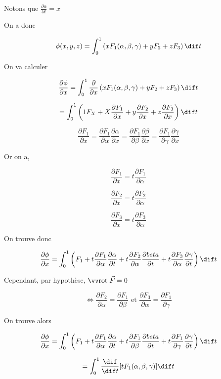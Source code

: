 Notons que $\frac{\partial \alpha}{\partial t} = x$

On a donc

\[\phi (x,y,z) = \int_0^1 \left( x F_1 (\alpha, \beta, \gamma ) + y F_2 + z F_3 \right) \dif t \]

On va calculer

\[\frac{\partial \phi}{\partial x} = \int_0^1 \frac{\partial}{\partial x} \left( x F_1 (\alpha, \beta, \gamma ) + y F_2 + z F_3 \right) \dif t\]

\[= \int_0^1 \left( 1F_X +X \frac{\partial F_1}{\partial x} + y \frac{\partial F_2}{\partial x} + z \frac{\partial F_3}{\partial x} \right) \dif t\]


\[
\frac{\partial F_1}{\partial x} = \frac{\partial F_1}{\partial \alpha} \frac{\partial \alpha}{\partial x}
=\frac{\partial F_1}{\partial \beta} \frac{\partial \beta}{\partial x}
=\frac{\partial F_1}{\partial \gamma} \frac{\partial \gamma}{\partial x}
\]

Or on a,

\[\frac{\partial F_1}{\partial x} = t \frac{\partial F_1}{\partial \alpha}\]

\[\frac{\partial F_2}{\partial x} = t \frac{\partial F_2}{\partial \alpha}\]

\[\frac{\partial F_3}{\partial x} = t \frac{\partial F_3}{\partial \alpha}\]

On trouve donc

\[\frac{\partial \phi}{\partial x}=\int_0^1 \left( F_1+t \frac{\partial F_1}{\partial \alpha} \frac{\partial \alpha}{\partial t}
+t \frac{\partial F_2}{\partial \alpha} \frac{\partial \\beta}{\partial t}
+t \frac{\partial F_3}{\partial \alpha} \frac{\partial \gamma}{\partial t}
\right) \dif t
\]

Cependant, par hypothèse, $\rot \vec F = 0$

\[\Leftrightarrow  \frac{\partial F_2}{\partial \alpha} = \frac{\partial F_1}{\partial \beta} \text{ et }  \frac{\partial F_3}{\partial \alpha} = \frac{\partial F_1}{\partial \gamma} \]

On trouve alors

\[
\frac{\partial \phi}{\partial x}=\int_0^1 \left( F_1 +t \frac{\partial F_1}{\partial \alpha} \frac{\partial \alpha}{\partial t}
+t \frac{\partial F_1}{\partial \beta} \frac{\partial \\beta}{\partial t}
+t \frac{\partial F_1}{\partial \gamma} \frac{\partial \gamma}{\partial t}
\right) \dif t
\]

\[=\int_0^1 \frac{\dif }{\dif t}[t F_1 ( \alpha, \beta, \gamma ) ] \dif t \]

